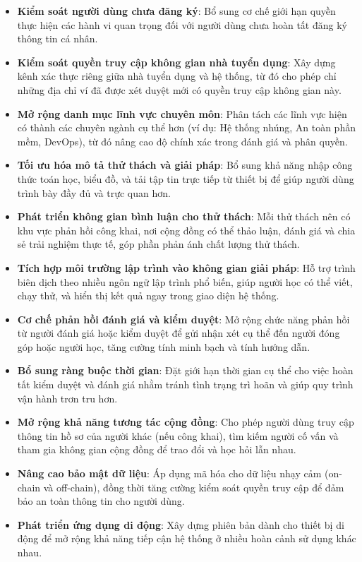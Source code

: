 \begin{itemize}
  \item \textbf{Kiểm soát người dùng chưa đăng ký}: Bổ sung cơ chế giới hạn quyền thực hiện các hành vi quan trọng đối với người dùng chưa hoàn tất đăng ký thông tin cá nhân.
  \item \textbf{Kiểm soát quyền truy cập không gian nhà tuyển dụng}: Xây dựng kênh xác thực riêng giữa nhà tuyển dụng và hệ thống, từ đó cho phép chỉ những địa chỉ ví đã được xét duyệt mới có quyền truy cập không gian này.
  \item \textbf{Mở rộng danh mục lĩnh vực chuyên môn}: Phân tách các lĩnh vực hiện có thành các chuyên ngành cụ thể hơn (ví dụ: Hệ thống nhúng, An toàn phần mềm, DevOps), từ đó nâng cao độ chính xác trong đánh giá và phân quyền.
  \item \textbf{Tối ưu hóa mô tả thử thách và giải pháp}: Bổ sung khả năng nhập công thức toán học, biểu đồ, và tải tập tin trực tiếp từ thiết bị để giúp người dùng trình bày đầy đủ và trực quan hơn.
  \item \textbf{Phát triển không gian bình luận cho thử thách}: Mỗi thử thách nên có khu vực phản hồi công khai, nơi cộng đồng có thể thảo luận, đánh giá và chia sẻ trải nghiệm thực tế, góp phần phản ánh chất lượng thử thách.
  \item \textbf{Tích hợp môi trường lập trình vào không gian giải pháp}: Hỗ trợ trình biên dịch theo nhiều ngôn ngữ lập trình phổ biến, giúp người học có thể viết, chạy thử, và hiển thị kết quả ngay trong giao diện hệ thống.
  \item \textbf{Cơ chế phản hồi đánh giá và kiểm duyệt}: Mở rộng chức năng phản hồi từ người đánh giá hoặc kiểm duyệt để gửi nhận xét cụ thể đến người đóng góp hoặc người học, tăng cường tính minh bạch và tính hướng dẫn.
  \item \textbf{Bổ sung ràng buộc thời gian}: Đặt giới hạn thời gian cụ thể cho việc hoàn tất kiểm duyệt và đánh giá nhằm tránh tình trạng trì hoãn và giúp quy trình vận hành trơn tru hơn.
  \item \textbf{Mở rộng khả năng tương tác cộng đồng}: Cho phép người dùng truy cập thông tin hồ sơ của người khác (nếu công khai), tìm kiếm người cố vấn và tham gia không gian cộng đồng để trao đổi và học hỏi lẫn nhau.
  \item \textbf{Nâng cao bảo mật dữ liệu}: Áp dụng mã hóa cho dữ liệu nhạy cảm (on-chain và off-chain), đồng thời tăng cường kiểm soát quyền truy cập để đảm bảo an toàn thông tin cho người dùng.
  \item \textbf{Phát triển ứng dụng di động}: Xây dựng phiên bản dành cho thiết bị di động để mở rộng khả năng tiếp cận hệ thống ở nhiều hoàn cảnh sử dụng khác nhau.
\end{itemize}